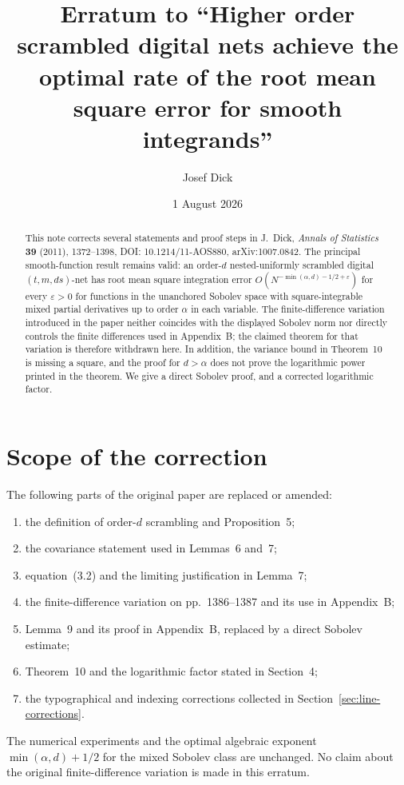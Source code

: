 \documentclass[11pt]{article}
\title{Erratum to ``Higher order scrambled digital nets achieve the optimal rate of the root mean square error for smooth integrands''}
\author{Josef Dick}
\date{1 August 2026}
\newcommand{\eps}{\varepsilon}
\begin{document}
\maketitle

\begin{abstract}
This note corrects several statements and proof steps in J.~Dick,
\emph{Annals of Statistics} \textbf{39} (2011), 1372--1398,
DOI: 10.1214/11-AOS880, arXiv:1007.0842.
The principal smooth-function result remains valid: an order-$d$
nested-uniformly scrambled digital $(t,m,ds)$-net has root mean square
integration error $O(N^{-\min(\alpha,d)-1/2+\eps})$ for every $\eps>0$ for
functions in the unanchored Sobolev space with square-integrable mixed
partial derivatives up to order $\alpha$ in each variable.  The finite-difference variation introduced in the paper neither coincides with the displayed Sobolev norm nor directly
controls the finite differences used in Appendix~B; the claimed theorem for
that variation is therefore withdrawn here.  In addition, the variance bound
in Theorem~10 is missing a square, and the proof for $d>\alpha$ does not prove
the logarithmic power printed in the theorem.  We give a direct Sobolev proof, and a corrected logarithmic factor.
\end{abstract}

\section{Scope of the correction}

The following parts of the original paper are replaced or amended:
\begin{enumerate}[label=(\roman*),leftmargin=2.2em]
\item the definition of order-$d$ scrambling and Proposition~5;
\item the covariance statement used in Lemmas~6 and~7;
\item equation~(3.2) and the limiting justification in Lemma~7;
\item the finite-difference variation on pp.~1386--1387 and its use in Appendix~B;
\item Lemma~9 and its proof in Appendix~B, replaced by a direct Sobolev estimate;
\item Theorem~10 and the logarithmic factor stated in Section~4;
\item the typographical and indexing corrections collected in Section~\ref{sec:line-corrections}.
\end{enumerate}
The numerical experiments and the optimal algebraic exponent
$\min(\alpha,d)+1/2$ for the mixed Sobolev class are unchanged.  No claim
about the original finite-difference variation is made in this erratum.
\end{document}
